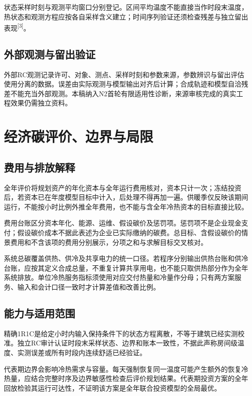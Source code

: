 \documentclass[12pt,a4paper]{article}
\newcommand{\supcite}[1]{\textsuperscript{[#1]}}
\begin{document}
状态采样时刻与观测平均窗口分别登记。区间平均温度不能直接当作时段末温度，热状态和观测方程应按各自采样含义建立；时间序列验证还须检查残差与独立留出表现\supcite{3}。

\subsection{外部观测与留出验证}

外部RC观测记录许可、对象、测点、采样时刻和参数来源，参数辨识与留出评估使用分离的数据。误差由实际观测与模型输出对齐后计算；合成轨迹和模型自洽残差不能充当外部观测。本稿纳入N2首轮有限适用性诊断，来源审核完成的真实工程效果仍需独立资料。

\clearpage

\clearpage


\clearpage
\section{经济碳评价、边界与局限}

\subsection{费用与排放解释}

全年评价将规划资产的年化资本与全年运行费用核对，资本只计一次；冻结投资后，若资本已在年度模型目标中计入，后处理不得再加一遍。供暖季仅反映该期间运行，不能按小时比例外推全年费用，也不能与含全年冷热资本的目标直接比较。

费用台账区分资本年化、能源、运维、假设碳价及惩罚项。惩罚项不是企业现金支付；假设碳价成本不据此表述为企业已实际缴纳的碳费。总目标、含假设碳价的情景费用和不含该项的费用分别展示，分项之和与求解目标交叉核对。

系统总碳覆盖供热、供冷及共享电力的统一口径。若程序分别输出供热台账和供冷台账，应按其定义合成总量，不重复计算共享用电，也不能只取供热部分作为全年系统排放。单位冷热服务指标须使用对应交付热量和冷量作分母；只有两方案服务、输入和会计口径一致时才计算差值和改善比例。

\subsection{能力与适用范围}

精确1R1C是给定小时内输入保持条件下的状态方程离散，不等于建筑已经实测校准。独立RC审计认证时段末采样状态、边界和账本一致性，不据此声称房间级温度、实测误差或所有时段内连续舒适已经验证。

代表期边界会影响冷热需求与容量。每天强制恢复同一温度可能产生额外的恢复冷热量，应结合完整时序及边界敏感性检查后评价规划结果。代表期投资方案的全年回放检验其运行可达性，不证明该方案是全年联合投资模型的全局最优。
\end{document}
